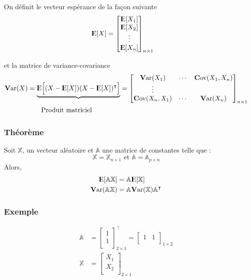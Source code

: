 \documentclass[11pt,french]{report}
\newcommand{\E}{{\rm I\kern-.3em E}}
\newcommand{\Var}{\mathrm{\textbf{V}ar}}
\newcommand{\Cov}{\mathrm{\textbf{C}ov}}
\begin{document}
On définit le vecteur espérance de la façon suivante
\begin{align*}
\E[X] &=
\begin{bmatrix} 
\E[X_1] \\
\E[X_2 ]\\
\vdots \\
\E[X_n] \\
\end{bmatrix}_{n \times 1}
\end{align*}

et la matrice de variance-covariance
\begin{align*}
\Var(X) &=\underbrace{\E\Big[(X -\E[X])(X-\E[X])^\intercal\Big]}  =
\begin{bmatrix} 
\Var(X_1) &\cdots & \Cov(X_1,X_n) \\
\vdots \\
\Cov(X_n,X_1) & \cdots & \Var(X_n)\\
\end{bmatrix}_{n \times 1}\\
& \text{\ \ \ \ \ \ Produit matriciel}
\end{align*}

\subsubsection*{Théorème}
\label{sec:theo}

Soit $\mathbb{X}$, un vecteur aléatoire et $\mathbb{A}$ une matrice de constantes telle que :
$$
\mathbb{X} = \mathbb{X}_{n \times 1} \text{ et } \mathbb{A} = \mathbb{A}_{p \times n}
$$
Alors,
\begin{align*}
\E[\mathbb{AX}] &= \mathbb{A}\E[\mathbb{X}] \\
\Var(\mathbb{A}\mathbb{X}) &= \mathbb{A} \Var(\mathbb{X})\mathbb{A}^\intercal \\
\end{align*}

\subsubsection*{Exemple}
\begin{align*}
\mathbb{A} &= 
     \begin{bmatrix} 
     1 \\
     1\\
     \end{bmatrix}_{2 \times 1}^\intercal 
  = \begin{bmatrix} 
     1 & 1 \\
     \end{bmatrix}_{1 \times 2} \\
\mathbb{X} &= 
     \begin{bmatrix} 
     X_1 \\
     X_2\\
     \end{bmatrix}_{2 \times 1}\\
\end{align*}
\end{document}
